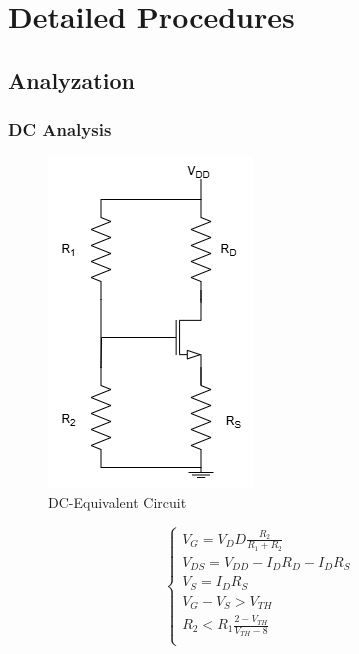 \section{Detailed Procedures}
    \subsection{Analyzation}
    \subsubsection{DC Analysis}
        \begin{figure}[h]
            \centering
            \includegraphics[width=0.5\linewidth]{Lab09/L9DC.drawio.png}
            \caption{DC-Equivalent Circuit}
            \label{l9dc}
        \end{figure}
        \FloatBarrier
        \begin{equation*}
            \begin{cases}
                V_G=V_DD\frac{R_2}{R_1+R_2}\\
                V_{DS}=V_{DD}-I_DR_D-I_DR_S\\
                V_S=I_DR_S\\
                V_G-V_S>V_{TH}\\
                R_2<R_1\frac{2-V_{TH}}{V_{TH}-8}\\
            \end{cases}
        \end{equation*}
